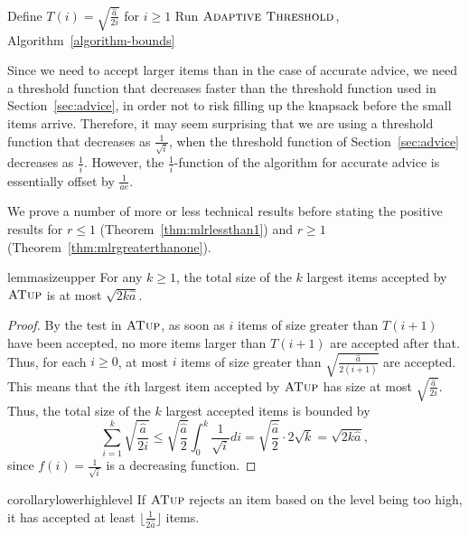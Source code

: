 \documentclass[a4paper,UKenglish,cleveref, autoref, thm-restate]{lipics-v2021}
\newcommand{\bALG}{\ensuremath{\operatorname{\textsc{Adaptive Threshold}}}\xspace}
\newcommand{\ubALG}{\ensuremath{\operatorname{\textsc{Adaptive Threshold for Untrusted Predictions}}}\xspace}
\newcommand{\MLB}{\ensuremath{\operatorname{\textsc{ATup}}}\xspace}
\newcommand{\TF}{T}
\newcommand{\guess}{\ensuremath{\hat{a}}\xspace}
\begin{document}
\begin{algorithm}
\begin{algorithmic}[1]
\State Define $\TF(i)=\sqrt{\frac{\guess}{2i}}$ for $i \geq 1$
\State Run \bALG, Algorithm~\ref{algorithm-bounds}
\end{algorithmic}
\caption{\ubALG, \MLB.}
\label{algorithm-ml}
\end{algorithm}

Since we need to accept larger items than in the case of accurate
advice, we need a threshold function that decreases faster than the
threshold function used in Section~\ref{sec:advice}, in order not to risk
filling up the knapsack before the small items arrive.  Therefore, it may
seem surprising that we are using a threshold function that decreases
as $\frac{1}{\sqrt{i}}$, when the threshold function of
Section~\ref{sec:advice} decreases as $\frac1i$.  However, the
$\frac1i$-function of the algorithm for accurate advice is essentially
offset by $\frac{1}{ae}$.

We prove a number of more or less technical results before stating the
positive results for $r \leq 1$ (Theorem~\ref{thm:mlrlessthan1}) and
$r \geq 1$ (Theorem~\ref{thm:mlrgreaterthanone}).

\begin{restatable}{lemma}{sizeupper}
\label{lemma:sizeupper}
For any $k \geq 1$, the total size of the $k$ largest items accepted
by \MLB is at most $\sqrt{2k\guess}$.
\end{restatable}

\begin{proof}
  By the test in \MLB, as soon as $i$ items of size greater than
  $\TF(i+1)$ have been accepted, no more items larger than $\TF(i+1)$ are
  accepted after that.  Thus, for each $i \geq 0$, at most $i$ items
  of size greater than $\sqrt{\frac{\guess}{2(i+1)}}$ are accepted.  This
  means that the $i$th largest item accepted by \MLB has size at most
  $\sqrt{\frac{\guess}{2i}}$.  Thus, the total size of the $k$ largest
  accepted items is bounded by
$$\sum_{i=1}^{k}
\sqrt{\frac{\guess}{2i}}\leq  \sqrt{\frac{\guess}{2}}\int_0^{k} \frac{1}{\sqrt{i}}di
= \sqrt{\frac{\guess}{2}} \cdot 2\sqrt{k}=\sqrt{2k\guess},$$
since $f(i)=\frac{1}{\sqrt{i}}$ is a decreasing function.
\end{proof}

\begin{restatable}{corollary}{lowerhighlevel}
  \label{cor:lowerhighlevel}
  If \MLB rejects an item based on the level being too high, it has
  accepted at least $\lfloor\frac{1}{2\guess}\rfloor$ items.
\end{restatable}
\end{document}
